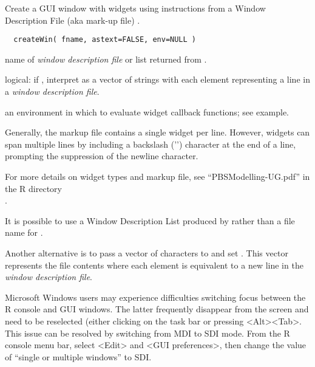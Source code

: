 \documentclass[letterpaper]{book}
\begin{document}
%
\begin{Description}\relax
Create a GUI window with widgets using instructions from a 
Window Description File (aka mark-up file) .
\end{Description}
%
\begin{Usage}
\begin{verbatim}
  createWin( fname, astext=FALSE, env=NULL )
\end{verbatim}
\end{Usage}
%
\begin{Arguments}
\begin{ldescription}
\item[\code{fname}] name of \emph{window description file} 
or list returned from .
\item[\code{astext}] logical: if , interpret  
as a vector of strings with each element representing a line 
in a \emph{window description file}.
\item[\code{env}] an environment in which to evaluate widget callback functions; see example.
\end{ldescription}
\end{Arguments}
%
\begin{Details}\relax
Generally, the markup file contains a single widget per line. However, widgets 
can span multiple lines by including a backslash ('\bsl{}') character at the end of 
a line, prompting the suppression of the newline character.

For more details on widget types and markup file, see ``PBSModelling-UG.pdf'' 
in the R directory \\{} .

It is possible to use a Window Description List produced by 
 rather than a file name for .

Another alternative is to pass a vector of characters to  and set 
. This vector represents the file contents where each element 
is equivalent to a new line in the \emph{window description file}.
\end{Details}
%
\begin{Note}\relax
Microsoft Windows users may experience difficulties switching focus between the 
R console and GUI windows. The latter frequently disappear from the screen and 
need to be reselected (either clicking on the task bar or pressing <Alt><Tab>. 
This issue can be resolved by switching from MDI to SDI mode. From the R console 
menu bar, select <Edit> and <GUI preferences>, then change the value of 
``single or multiple windows'' to SDI.
\end{Note}
\end{document}
